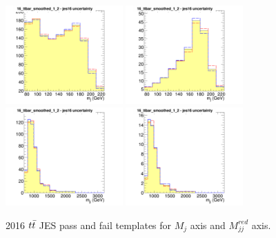 \begin{figure}[!htb]
	\centering
	\includegraphics[width=0.4\textwidth]{Figures/Uncertainty_16_ttbar_smoothed_1_2_jes16failX.png}
	\includegraphics[width=0.4\textwidth]{Figures/Uncertainty_16_ttbar_smoothed_1_2_jes16passX.png}
	\includegraphics[width=0.4\textwidth]{Figures/Uncertainty_16_ttbar_smoothed_1_2_jes16failY.png}
	\includegraphics[width=0.4\textwidth]{Figures/Uncertainty_16_ttbar_smoothed_1_2_jes16passY.png}
	\caption{2016 $t\bar{t} $ JES pass and fail templates for $M_j$ axis and $M_{jj}^{red}$ axis.}
	\label{fig:jesttbar2}
\end{figure}

